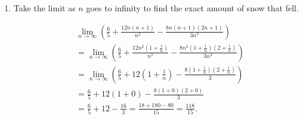 \documentclass[handout,nooutcomes]{ximera}
\begin{document}
\begin{problem}
\begin{enumerate}
	\item  Take the limit as $n$ goes to infinity to find the exact amount of snow that fell.
		\begin{freeResponse}
			\begin{align*}
			&  \lim_{n \to \infty} \left( \frac{6}{5} + \frac{12n(n+1)}{n^2} - \frac{8n(n+1)(2n+1)}{3n^3} \right)  \\
			&= \lim_{n \to \infty} \left( \frac{6}{5} + \frac{12n^2(1+\frac{1}{n})}{n^2} - \frac{8n^3(1+\frac{1}{n})(2+\frac{1}{n})}{3n^3} \right)  \\
			&= \lim_{n \to \infty} \left( \frac{6}{5} + 12 \left( 1 + \frac{1}{n} \right) - \frac{8(1 + \frac{1}{n})(2 + \frac{1}{n})}{3} \right)  \\
			&= \frac{6}{5} + 12(1 + 0) - \frac{8(1+0)(2+0)}{3}  \\
			&= \frac{6}{5} + 12 - \frac{16}{3} = \frac{18 + 180 - 80}{15} = \frac{118}{15}.
			\end{align*}
		\end{freeResponse}
		
		
		
	\end{enumerate}
		
		
\end{problem}
\end{document}
